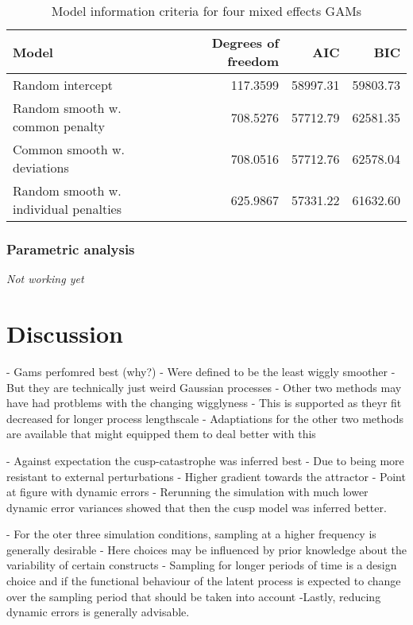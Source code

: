 \documentclass[man, floatsintext]{apa7}
\begin{document}
\begin{table}[htbp]
  \vspace*{2em}
  \begin{threeparttable}
    \caption{Model information criteria for four mixed effects GAMs}
    \label{tab:ic_tab}
    \begin{tabular}{@{}lrrr@{}} \toprule
      Model                                 & Degrees of freedom & AIC      &
      BIC
      \\ \midrule
      Random intercept                      & 117.3599           & 58997.31 &
      59803.73
      \\
      Random smooth w. common penalty       & 708.5276           & 57712.79 &
      62581.35
      \\
      Common smooth w. deviations           & 708.0516           & 57712.76 &
      62578.04
      \\
      Random smooth w. individual penalties & 625.9867           & 57331.22 &
      61632.60
      \\ \midrule
    \end{tabular}
  \end{threeparttable}
\end{table}

\subsubsection{Parametric analysis}

\textit{Not working yet}

\section{Discussion}

- Gams perfomred best (why?)
- Were defined to be the least wiggly smoother
- But they are technically just weird Gaussian processes
- Other two methods may have had protblems with the changing wigglyness
- This is supported as theyr fit decreased for longer process lengthscale
- Adaptiations for the other two methods are available that might equipped
them to deal better with this

- Against expectation the cusp-catastrophe was inferred best
- Due to being more resistant to external perturbations
- Higher gradient towards the attractor
- Point at figure with dynamic errors
- Rerunning the simulation with much lower dynamic error variances showed
that then the cusp model was inferred better.

- For the oter three simulation conditions, sampling at a higher frequency is
generally desirable
- Here choices may be influenced by prior knowledge about the variability
of certain constructs
- Sampling for longer periods of time is a design choice and if the
functional behaviour of the latent process is expected to change over the
sampling period that should be taken into account
-Lastly, reducing dynamic errors is generally advisable.
\end{document}
